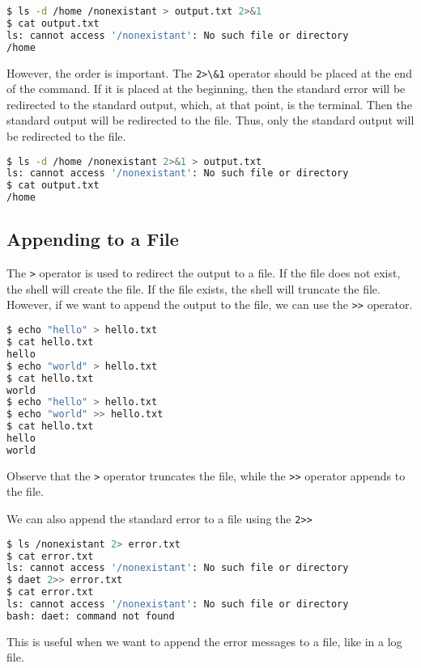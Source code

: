 \begin{lstlisting}[language=bash]
$ ls -d /home /nonexistant > output.txt 2>&1
$ cat output.txt
ls: cannot access '/nonexistant': No such file or directory
/home
\end{lstlisting}

However, the order is important. The \lstinline|2>\&1| operator should
be placed at the end of the command. If it is placed at the beginning,
then the standard error will be redirected to the standard output, which,
at that point, is the terminal. Then the standard output will be redirected
to the file. Thus, only the standard output will be redirected to the file.

\begin{lstlisting}[language=bash]
$ ls -d /home /nonexistant 2>&1 > output.txt
ls: cannot access '/nonexistant': No such file or directory
$ cat output.txt
/home
\end{lstlisting}

\subsection{Appending to a File}

The \lstinline|>| operator is used to redirect the output to a file. If the
file does not exist, the shell will create the file. If the file exists,
the shell will truncate the file. However, if we want to append the output
to the file, we can use the \lstinline|>>| operator.

\begin{lstlisting}[language=bash]
$ echo "hello" > hello.txt
$ cat hello.txt
hello
$ echo "world" > hello.txt
$ cat hello.txt
world
$ echo "hello" > hello.txt
$ echo "world" >> hello.txt
$ cat hello.txt
hello
world
\end{lstlisting}

Observe that the \lstinline|>| operator truncates the file, while the
\lstinline|>>| operator appends to the file.

We can also append the standard error to a file using the \lstinline|2>>|

\begin{lstlisting}[language=bash]
$ ls /nonexistant 2> error.txt
$ cat error.txt
ls: cannot access '/nonexistant': No such file or directory
$ daet 2>> error.txt
$ cat error.txt
ls: cannot access '/nonexistant': No such file or directory
bash: daet: command not found
\end{lstlisting}

This is useful when we want to append the error messages to a file,
like in a log file.

